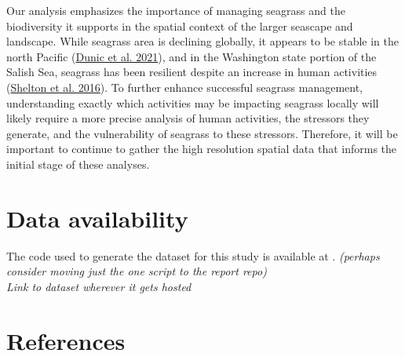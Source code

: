 \documentclass[12pt]{article}\usepackage[]{graphicx}\usepackage[]{color}
\begin{document}
Our analysis emphasizes the importance of managing seagrass and the biodiversity it supports in the spatial context of the larger seascape and landscape. While seagrass area is declining globally, it appears to be stable in the north Pacific (\protect\hyperlink{ref-Dunic2021}{Dunic et al. 2021}), and in the Washington state portion of the Salish Sea, seagrass has been resilient despite an increase in human activities (\protect\hyperlink{ref-Shelton2016}{Shelton et al. 2016}). To further enhance successful seagrass management, understanding exactly which activities may be impacting seagrass locally will likely require a more precise analysis of human activities, the stressors they generate, and the vulnerability of seagrass to these stressors. Therefore, it will be important to continue to gather the high resolution spatial data that informs the initial stage of these analyses.

\hypertarget{data-availability}{%
\section{Data availability}\label{data-availability}}

The code used to generate the dataset for this study is available at . \emph{(perhaps consider moving just the one script to the report repo)}\\
\emph{Link to dataset wherever it gets hosted}

\clearpage

\hypertarget{references}{%
\section{References}\label{references}}

\noindent \vspace{-2em} \setlength{\parindent}{-0.2in} \setlength{\leftskip}{0.2in} \setlength{\parskip}{8pt}
\end{document}
